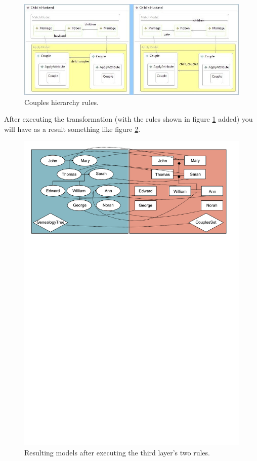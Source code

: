 \begin{figure}[h]
\begin{center}
  \includegraphics[width=\textwidth]{imgs/couples_hierarchy_rules.jpg}
  \caption{Couples hierarchy rules.}
  \label{fig:couples_hierarchy_rules}
\end{center}
\end{figure}

After executing the transformation (with the rules shown in figure
\ref{fig:couples_hierarchy_rules} added) you will have as a result something
like figure \ref{fig:third_layer_result_inc}.

\begin{figure}[h]
\begin{center}
  \includegraphics[scale=0.6, trim=0.5cm 20.4cm 1.0cm 0.6cm,
  clip]{imgs/third_layer_result_inc.pdf}
  \caption{Resulting models after executing the third layer's two rules.}
  \label{fig:third_layer_result_inc}
\end{center}
\end{figure} 

